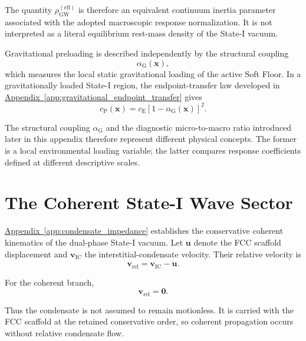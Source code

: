 The quantity $\rho_{\mathrm{GW}}^{(\mathrm{eff})}$ is therefore an equivalent continuum inertia parameter associated with the adopted macroscopic response normalization. It is not interpreted as a literal equilibrium rest-mass density of the State-I vacuum.

Gravitational preloading is described independently by the structural coupling
\begin{equation}
    \alpha_{\mathrm{G}}(\mathbf{x}),
\end{equation}
which measures the local static gravitational loading of the active Soft Floor. In a gravitationally loaded State-I region, the endpoint-transfer law developed in \hyperref[app:gravitational_endpoint_transfer]{Appendix~\ref*{app:gravitational_endpoint_transfer}} gives
\begin{equation}
    c_{\mathrm{P}}(\mathbf{x}) = c_{\mathrm{E}} \left[ 1-\alpha_{\mathrm{G}}(\mathbf{x}) \right]^2.
\end{equation}

The structural coupling $\alpha_{\mathrm{G}}$ and the diagnostic micro-to-macro ratio introduced later in this appendix therefore represent different physical concepts. The former is a local environmental loading variable; the latter compares response coefficients defined at different descriptive scales.

\section{The Coherent State-I Wave Sector}

\hyperref[app:condensate_impedance]{Appendix~\ref*{app:condensate_impedance}} establishes the conservative coherent kinematics of the dual-phase State-I vacuum. Let $\mathbf{u}$ denote the FCC scaffold displacement and $\mathbf{v}_{\mathrm{IC}}$ the interstitial-condensate velocity. Their relative velocity is
\begin{equation}
    \mathbf{v}_{\mathrm{rel}} = \mathbf{v}_{\mathrm{IC}} - \dot{\mathbf{u}}.
\end{equation}

For the coherent branch,
\begin{equation}
    \mathbf{v}_{\mathrm{rel}} = \mathbf{0}.
\end{equation}

Thus the condensate is not assumed to remain motionless. It is carried with the FCC scaffold at the retained conservative order, so coherent propagation occurs without relative condensate flow.

